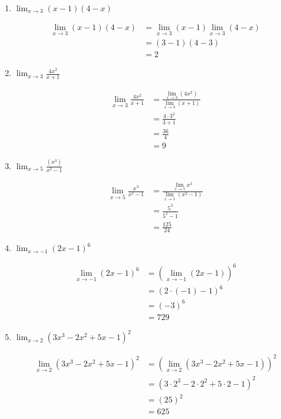 \documentclass[a4paper, 12pt]{article}
\begin{document}
\begin{enumerate}
\begin{enumerate}
        \item $\lim_{x \to 3} (x-1) (4-x)$
        
        \begin{align*}
            \lim_{x \to 3} (x-1) (4-x) &= \lim_{x \to 3}(x-1) \lim_{x \to 3}(4-x) \tag*{[l. prod.]}\\
            &= (3-1) (4-3) \tag*{[l. pol.]}\\
            &= 2
        \end{align*}

        \item $\lim_{x \to 3} \frac{4x^2}{x+1}$
        
        \begin{align*}
            \lim_{x \to 3} \frac{4x^2}{x+1} &= \frac{\lim_{x \to 3}(4x^2)}{\lim_{x \to 3}(x+1)} \tag*{[l. quo]}\\
            &= \frac{4\cdot 3^2}{3+1} \tag*{[l. pol.]} \\
            &= \frac{36}{4}\\
            &= 9
        \end{align*}

        \item $\lim_{x \to 5}\frac{(x^3)}{x^2 -1}$
        
        \begin{align*}
            \lim_{x \to 5}\frac{x^3}{x^2 -1} &= \frac{\lim_{x \to 5}x^3}{\lim_{x \to 5}(x^2 -1)} \tag*{[l. quo.]}\\
            &= \frac{5^3}{5^2 -1} \tag*{[l. pol.]}\\
            &= \frac{125}{24}
        \end{align*}

        \item $\lim_{x \to -1}(2x -1)^6$
        
        \begin{align*}
            \lim_{x \to -1}(2x -1)^6 &= \left( \lim_{x \to -1}(2x -1) \right)^6 \tag*{[l. pot.]}\\
            &= (2\cdot (-1) -1)^6 \tag*{[l. pol.]}\\
            &= (-3)^6\\
            &= 729
        \end{align*}

        \item $\lim_{x \to 2} (3x^3 - 2x^2 + 5x - 1)^2$
        
        \begin{align*}
            \lim_{x \to 2} (3x^3 - 2x^2 + 5x - 1)^2 &= \left(  \lim_{x \to 2}(3x^3 - 2x^2 + 5x - 1) \right)^2 \tag*{[l. pot.]}\\
            &= (3\cdot 2^3 - 2\cdot 2^2 + 5\cdot 2 - 1)^2 \tag*{[l. pol.]} \\
            &= (25)^2 \\
            &= 625
        \end{align*}


\end{enumerate}
\end{enumerate}
\end{document}
